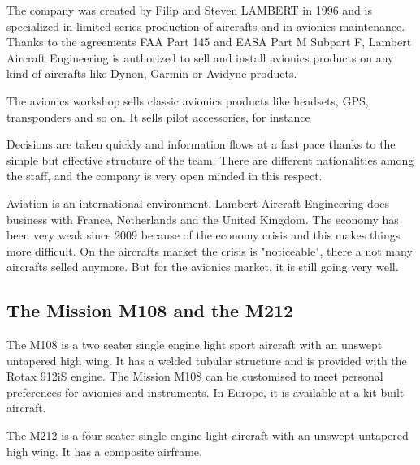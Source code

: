 \documentclass[11pt,a4paper]{report}
\begin{document}

The company was created by Filip and Steven LAMBERT in 1996 and is specialized in limited series production of aircrafts and in avionics maintenance. Thanks to the agreements FAA Part 145 and EASA Part M Subpart F, Lambert Aircraft Engineering is authorized to sell and install avionics products on any kind of aircrafts like Dynon, Garmin or Avidyne products.

\bigskip

The avionics workshop sells classic avionics products like headsets, GPS, transponders and so on. It sells pilot accessories, for instance %

\bigskip

Decisions are taken quickly and information flows at a fast pace thanks to the simple but effective structure of the team.  There are different nationalities among the staff, and the company is very open minded in this respect.

\bigskip

Aviation is an international environment. Lambert Aircraft Engineering does business with France, Netherlands and the United Kingdom. The economy has been very weak since 2009 because of the economy crisis and this makes things more difficult. On the aircrafts market the crisis is "noticeable", there a not many aircrafts selled anymore. But for the avionics market, it is still going very well.

\subsection{The Mission M108 and the M212}

The M108 is a two seater single engine light sport aircraft with an unswept untapered high wing. It has a welded tubular structure and is provided with the Rotax 912iS engine. The Mission M108 can be customised to meet personal preferences for avionics and instruments. In Europe, it is available at a kit built aircraft.

\bigskip

The M212 is a four seater single engine light aircraft with an unswept untapered high wing. It has a composite airframe.
\end{document}
